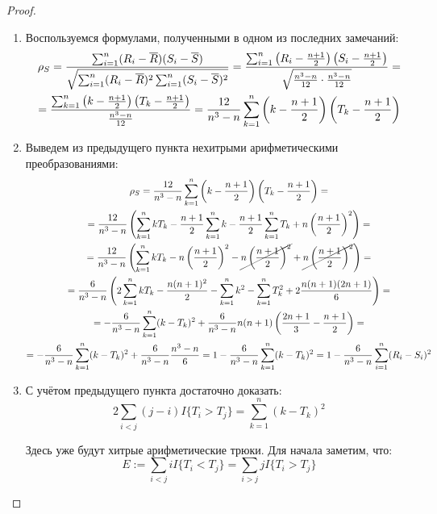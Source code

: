 \begin{proof}~
    \begin{enumerate}
        \item Воспользуемся формулами, полученными в одном из последних замечаний:
        \begin{multline*}
            \rho_S = \frac{\sum_{i=1}^n (R_i - \overline{R})(S_i-\overline{S})}{\sqrt{\sum_{i=1}^n (R_i-\overline{R})^2 \sum_{i=1}^n (S_i-\overline{S})^2}} = \frac{\sum_{i=1}^n \left(R_i - \frac{n+1}{2}\right)\left(S_i-\frac{n+1}{2}\right)}{\sqrt{\frac{n^3-n}{12} \cdot \frac{n^3-n}{12}}} =
            \\
            = \frac{\sum_{k=1}^n \left(k - \frac{n+1}{2}\right)\left(T_k-\frac{n+1}{2}\right)}{\frac{n^3-n}{12}} = \frac{12}{n^3-n} \sum\limits_{k=1}^n \left(k - \frac{n+1}{2}\right) \left(T_k -\frac{n+1}{2}\right)
        \end{multline*}

        \item Выведем из предыдущего пункта нехитрыми арифметическими преобразованиями:
        \begin{multline*}
            \rho_S = \frac{12}{n^3-n} \sum\limits_{k=1}^n \left(k - \frac{n+1}{2}\right) \left(T_k -\frac{n+1}{2}\right) =
            \\
            = \frac{12}{n^3-n} \left(\sum_{k=1}^n k T_k - \frac{n+1}{2} \sum_{k=1}^n k - \frac{n+1}{2} \sum_{k=1}^n T_k + n \left(\frac{n+1}{2}\right)^2\right) =
            \\
            = \frac{12}{n^3-n} \left(\sum_{k=1}^n k T_k - n \left(\frac{n+1}{2}\right)^2 - \cancel{n \left(\frac{n+1}{2}\right)^2} + \cancel{n \left(\frac{n+1}{2}\right)^2}\right) =
            \\
            = \frac{6}{n^3-n} \left(2 \sum_{k=1}^n k T_k - \frac{n(n+1)^2}{2} - \sum_{k=1}^n k^2 - \sum_{k=1}^n T_k^2 + 2 \frac{n(n+1)(2n+1)}{6}\right) =
            \\
            = -\frac{6}{n^3-n} \sum_{k=1}^n (k-T_k)^2 + \frac{6}{n^3-n} n(n+1) \left(\frac{2n+1}{3} - \frac{n+1}{2}\right) =
            \\
            = -\frac{6}{n^3-n} \sum_{k=1}^n (k-T_k)^2 + \frac{6}{n^3-n} \frac{n^3-n}{6} = 1 - \frac{6}{n^3-n} \sum_{k=1}^n (k-T_k)^2 = 1 - \frac{6}{n^3-n} \sum_{i=1}^n (R_i-S_i)^2
        \end{multline*}

        \item С учётом предыдущего пункта достаточно доказать:
        \[
            2 \sum_{i < j} (j-i) I\{T_i > T_j\} = \sum_{k=1}^n (k-T_k)^2
        \]

        Здесь уже будут хитрые арифметические трюки. Для начала заметим, что:
        \[
            E := \sum_{i < j} i I\{T_i < T_j\} = \sum_{i > j} j I\{T_i > T_j\}
        \]


\end{enumerate}
\end{proof}

